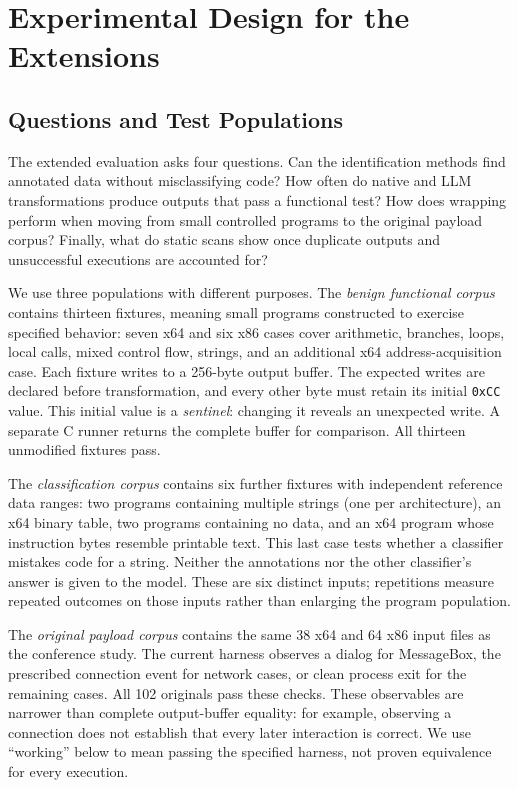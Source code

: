 \section{Experimental Design for the Extensions}\label{sec:methodology}
\subsection{Questions and Test Populations}
The extended evaluation asks four questions. Can the identification methods
find annotated data without misclassifying code? How often do native and
LLM transformations produce outputs that pass a functional test? How does
wrapping perform when moving from small controlled programs to the original
payload corpus? Finally, what do static scans show once duplicate outputs
and unsuccessful executions are accounted for?

We use three populations with different purposes. The \emph{benign
functional corpus} contains thirteen fixtures, meaning small programs
constructed to exercise specified behavior: seven x64 and six x86 cases
cover arithmetic, branches, loops, local calls, mixed control flow, strings,
and an additional x64 address-acquisition case. Each fixture writes to a
256-byte output buffer. The expected writes are declared before
transformation, and every other byte must retain its initial
\texttt{0xCC} value. This initial value is a \emph{sentinel}: changing it
reveals an unexpected write. A separate C runner returns the complete
buffer for comparison. All thirteen unmodified fixtures pass.

The \emph{classification corpus} contains six further fixtures with
independent reference data ranges: two programs containing multiple strings
(one per architecture), an x64 binary table, two programs containing no data,
and an x64 program whose instruction bytes resemble printable text. This
last case tests whether a classifier mistakes code for a string. Neither
the annotations nor the other classifier's answer is given to the model.
These are six distinct inputs; repetitions measure repeated outcomes on
those inputs rather than enlarging the program population.

The \emph{original payload corpus} contains the same 38 x64 and 64 x86
input files as the conference study. The current harness observes a dialog
for MessageBox, the prescribed connection event for network cases, or
clean process exit for the remaining cases. All 102 originals pass these
checks. These observables are narrower than complete output-buffer
equality: for example, observing a connection does not establish that every
later interaction is correct. We use ``working'' below to mean passing the
specified harness, not proven equivalence for every execution.

